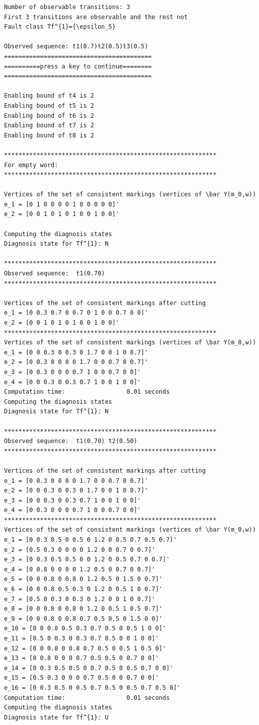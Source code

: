 \begin{verbatim}
Number of observable transitions: 3 
First 3 transitions are observable and the rest not
Fault class Tf^{1}={\epsilon_5}

Observed sequence: t1(0.7)t2(0.5)t3(0.5) 
=========================================
==========press a key to continue========
=========================================

Enabling bound of t4 is 2
Enabling bound of t5 is 2
Enabling bound of t6 is 2
Enabling bound of t7 is 2
Enabling bound of t8 is 2

***********************************************************
For empty word:
***********************************************************

Vertices of the set of consistent markings (vertices of \bar Y(m_0,w))
e_1 = [0 1 0 0 0 0 1 0 0 0 0 0]'
e_2 = [0 0 1 0 1 0 1 0 0 1 0 0]'

Computing the diagnosis states
Diagnosis state for Tf^{1}: N

***********************************************************
Observed sequence:  t1(0.70)
***********************************************************

Vertices of the set of consistent markings after cutting
e_1 = [0 0.3 0.7 0 0.7 0 1 0 0 0.7 0 0]'
e_2 = [0 0 1 0 1 0 1 0 0 1 0 0]'
***********************************************************
Vertices of the set of consistent markings (vertices of \bar Y(m_0,w))
e_1 = [0 0 0.3 0 0.3 0 1.7 0 0 1 0 0.7]'
e_2 = [0 0.3 0 0 0 0 1.7 0 0 0.7 0 0.7]'
e_3 = [0 0.3 0 0 0 0.7 1 0 0 0.7 0 0]'
e_4 = [0 0 0.3 0 0.3 0.7 1 0 0 1 0 0]'
Computation time:                 0.01 seconds
Computing the diagnosis states
Diagnosis state for Tf^{1}: N

***********************************************************
Observed sequence:  t1(0.70) t2(0.50)
***********************************************************

Vertices of the set of consistent markings after cutting
e_1 = [0 0.3 0 0 0 0 1.7 0 0 0.7 0 0.7]'
e_2 = [0 0 0.3 0 0.3 0 1.7 0 0 1 0 0.7]'
e_3 = [0 0 0.3 0 0.3 0.7 1 0 0 1 0 0]'
e_4 = [0 0.3 0 0 0 0.7 1 0 0 0.7 0 0]'
***********************************************************
Vertices of the set of consistent markings (vertices of \bar Y(m_0,w))
e_1 = [0 0.3 0.5 0 0.5 0 1.2 0 0.5 0.7 0.5 0.7]'
e_2 = [0.5 0.3 0 0 0 0 1.2 0 0 0.7 0 0.7]'
e_3 = [0 0.3 0.5 0.5 0 0 1.2 0 0.5 0.7 0 0.7]'
e_4 = [0 0.8 0 0 0 0 1.2 0.5 0 0.7 0 0.7]'
e_5 = [0 0 0.8 0 0.8 0 1.2 0.5 0 1.5 0 0.7]'
e_6 = [0 0 0.8 0.5 0.3 0 1.2 0 0.5 1 0 0.7]'
e_7 = [0.5 0 0.3 0 0.3 0 1.2 0 0 1 0 0.7]'
e_8 = [0 0 0.8 0 0.8 0 1.2 0 0.5 1 0.5 0.7]'
e_9 = [0 0 0.8 0 0.8 0.7 0.5 0.5 0 1.5 0 0]'
e_10 = [0 0 0.8 0.5 0.3 0.7 0.5 0 0.5 1 0 0]'
e_11 = [0.5 0 0.3 0 0.3 0.7 0.5 0 0 1 0 0]'
e_12 = [0 0 0.8 0 0.8 0.7 0.5 0 0.5 1 0.5 0]'
e_13 = [0 0.8 0 0 0 0.7 0.5 0.5 0 0.7 0 0]'
e_14 = [0 0.3 0.5 0.5 0 0.7 0.5 0 0.5 0.7 0 0]'
e_15 = [0.5 0.3 0 0 0 0.7 0.5 0 0 0.7 0 0]'
e_16 = [0 0.3 0.5 0 0.5 0.7 0.5 0 0.5 0.7 0.5 0]'
Computation time:                 0.01 seconds
Computing the diagnosis states
Diagnosis state for Tf^{1}: U


\end{verbatim}
